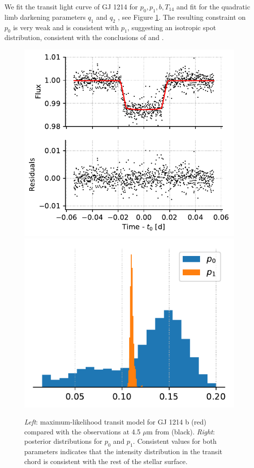 We fit the \spitzer transit light curve of GJ 1214 for $p_0, p_1, b, T_{14}$ and fit for the quadratic limb darkening parameters $q_1$ and $q_2$ \citep{Kipping2013}, see Figure \ref{fig:gj1214}. The resulting constraint on $p_0$ is very weak and is consistent with $p_1$, suggesting an isotropic spot distribution, consistent with the conclusions of \citet{Berta2011} and \citet{Narita2013}. 

\begin{figure}%
    \centering
    \includegraphics[scale=0.75]{robin/gj1214_residuals.pdf}
    \includegraphics[scale=0.75]{robin/gj1214_agreement.pdf}
    \caption{\textsl{Left}: maximum-likelihood transit model for GJ 1214 b (red) compared with the \spitzer observations at 4.5 $\mu$m from \citet{Gillon2014} (black). \textsl{Right}: posterior distributions for $p_0$ and $p_1$. Consistent values for both parameters indicates that the intensity distribution in the transit chord is consistent with the rest of the stellar surface.}
    \label{fig:gj1214}
\end{figure}

